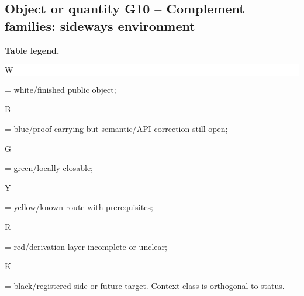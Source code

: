 \subsection*{Object or quantity G10 -- Complement families: sideways environment}
\hypertarget{objproof:G10}{}
\par\smallskip\noindent\begin{minipage}{0.99\linewidth}\footnotesize\raggedright\textbf{Table legend.} \colorbox{white}{\strut W} = white/finished public object; \colorbox{cyan!20}{\strut B} = blue/proof-carrying but semantic/API correction still open; \colorbox{green!18}{\strut G} = green/locally closable; \colorbox{yellow!25}{\strut Y} = yellow/known route with prerequisites; \colorbox{red!20}{\strut R} = red/derivation layer incomplete or unclear; \colorbox{black!18}{\strut K} = black/registered side or future target. Context class is orthogonal to status.\end{minipage}\par\vspace{0.25em}
